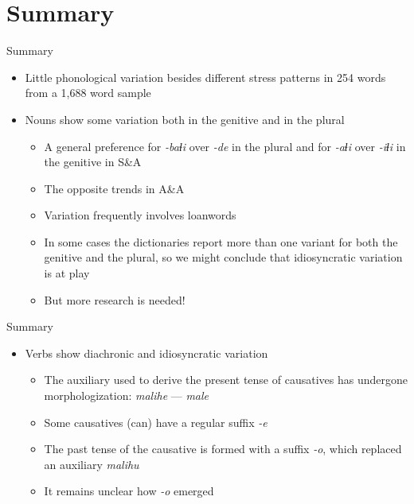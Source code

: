 \section{Summary}

\begin{frame}{Summary}
\begin{itemize}
    \item Little phonological variation besides different stress patterns in 254 words from a 1,688 word sample
    \item Nouns show some variation both in the genitive and in the plural
    \begin{itemize}
        \item A general preference for \textit{-baɬi} over \textit{-de} in the plural and for \textit{-aɬi} over \textit{-iɬi} in the genitive in S\&A
        \item The opposite trends in A\&A
        \item Variation frequently involves loanwords
        \item In some cases the dictionaries report more than one variant for both the genitive and the plural, so we might conclude that idiosyncratic variation is at play
        \pause
        \item But more research is needed!
    \end{itemize}
\end{itemize}
\end{frame}

\begin{frame}{Summary}
\begin{itemize}
    \item Verbs show diachronic and idiosyncratic variation
    \begin{itemize}
        \item The auxiliary used to derive the present tense of causatives has undergone morphologization: \textit{malihe} --- \textit{male}
        \item Some causatives (can) have a regular suffix \textit{-e}
        \item The past tense of the causative is formed with a suffix \textit{-o}, which replaced an auxiliary \textit{malihu}
        \item It remains unclear how \textit{-o} emerged
        \end{itemize}
    \end{itemize}
\end{frame}

